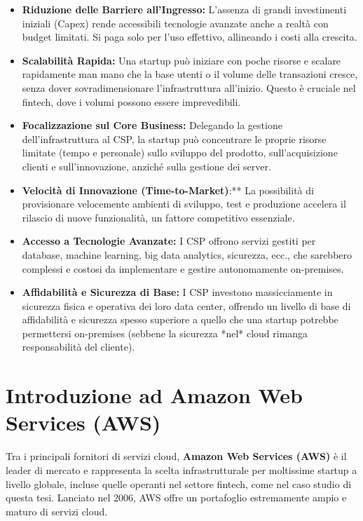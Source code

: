 \documentclass[a4paper,12pt]{report}
\begin{document}
\begin{itemize}
    \item \textbf{Riduzione delle Barriere all'Ingresso:} L'assenza di grandi investimenti iniziali (Capex) rende accessibili tecnologie avanzate anche a realtà con budget limitati. Si paga solo per l'uso effettivo, allineando i costi alla crescita.
    \item \textbf{Scalabilità Rapida:} Una startup può iniziare con poche risorse e scalare rapidamente man mano che la base utenti o il volume delle transazioni cresce, senza dover sovradimensionare l'infrastruttura all'inizio. Questo è cruciale nel fintech, dove i volumi possono essere imprevedibili.
    \item \textbf{Focalizzazione sul Core Business:} Delegando la gestione dell'infrastruttura al CSP, la startup può concentrare le proprie risorse limitate (tempo e personale) sullo sviluppo del prodotto, sull'acquisizione clienti e sull'innovazione, anziché sulla gestione dei server.
    \item \textbf{Velocità di Innovazione (Time-to-Market)}:** La possibilità di provisionare velocemente ambienti di sviluppo, test e produzione accelera il rilascio di nuove funzionalità, un fattore competitivo essenziale.
    \item \textbf{Accesso a Tecnologie Avanzate:} I CSP offrono servizi gestiti per database, machine learning, big data analytics, sicurezza, ecc., che sarebbero complessi e costosi da implementare e gestire autonomamente on-premises.
    \item \textbf{Affidabilità e Sicurezza di Base:} I CSP investono massicciamente in sicurezza fisica e operativa dei loro data center, offrendo un livello di base di affidabilità e sicurezza spesso superiore a quello che una startup potrebbe permettersi on-premises (sebbene la sicurezza *nel* cloud rimanga responsabilità del cliente).
\end{itemize}
\section{Introduzione ad Amazon Web Services (AWS)}
\label{sec:aws-intro}

Tra i principali fornitori di servizi cloud, \textbf{Amazon Web Services (AWS)} è il leader di mercato e rappresenta la scelta infrastrutturale per moltissime startup a livello globale, incluse quelle operanti nel settore fintech, come nel caso studio di questa tesi. Lanciato nel 2006, AWS offre un portafoglio estremamente ampio e maturo di servizi cloud.
\end{document}
